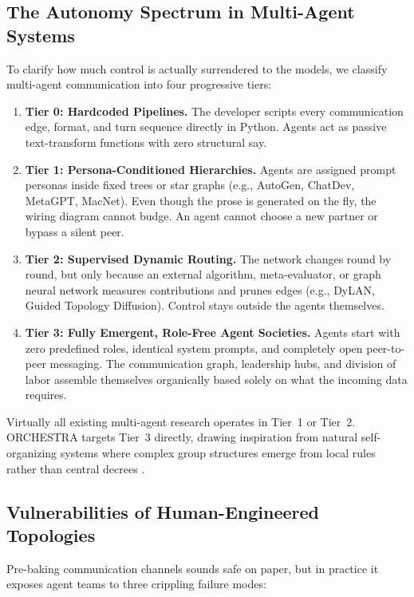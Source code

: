 \documentclass{ieeeaccess}
\begin{document}
\subsection{The Autonomy Spectrum in Multi-Agent Systems}
To clarify how much control is actually surrendered to the models, we classify multi-agent communication into four progressive tiers:
\begin{enumerate}
    \item \textbf{Tier 0: Hardcoded Pipelines.} The developer scripts every communication edge, format, and turn sequence directly in Python. Agents act as passive text-transform functions with zero structural say.
    \item \textbf{Tier 1: Persona-Conditioned Hierarchies.} Agents are assigned prompt personas inside fixed trees or star graphs (e.g., AutoGen, ChatDev, MetaGPT, MacNet). Even though the prose is generated on the fly, the wiring diagram cannot budge. An agent cannot choose a new partner or bypass a silent peer.
    \item \textbf{Tier 2: Supervised Dynamic Routing.} The network changes round by round, but only because an external algorithm, meta-evaluator, or graph neural network measures contributions and prunes edges (e.g., DyLAN, Guided Topology Diffusion). Control stays outside the agents themselves.
    \item \textbf{Tier 3: Fully Emergent, Role-Free Agent Societies.} Agents start with zero predefined roles, identical system prompts, and completely open peer-to-peer messaging. The communication graph, leadership hubs, and division of labor assemble themselves organically based solely on what the incoming data requires.
\end{enumerate}
Virtually all existing multi-agent research operates in Tier~1 or Tier~2. ORCHESTRA targets Tier~3 directly, drawing inspiration from natural self-organizing systems where complex group structures emerge from local rules rather than central decrees \cite{conway1970game}.

\subsection{Vulnerabilities of Human-Engineered Topologies}
Pre-baking communication channels sounds safe on paper, but in practice it exposes agent teams to three crippling failure modes:
\end{document}
